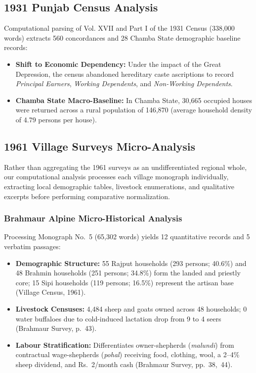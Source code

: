 \documentclass[11pt,a4paper]{article}
\begin{document}
\subsection{1931 Punjab Census Analysis}
Computational parsing of Vol. XVII and Part I of the 1931 Census (338,000 words) extracts 560 concordances and 28 Chamba State demographic baseline records:
\begin{itemize}[leftmargin=*]
    \item \textbf{Shift to Economic Dependency:} Under the impact of the Great Depression, the census abandoned hereditary caste ascriptions to record \textit{Principal Earners}, \textit{Working Dependents}, and \textit{Non-Working Dependents}.
    \item \textbf{Chamba State Macro-Baseline:} In Chamba State, 30,665 occupied houses were returned across a rural population of 146,870 (average household density of 4.79 persons per house).
\end{itemize}

\subsection{1961 Village Surveys Micro-Analysis}
Rather than aggregating the 1961 surveys as an undifferentiated regional whole, our computational analysis processes each village monograph individually, extracting local demographic tables, livestock enumerations, and qualitative excerpts before performing comparative normalization.

\subsubsection{Brahmaur Alpine Micro-Historical Analysis}
Processing Monograph No.~5 (65,302 words) yields 12 quantitative records and 5 verbatim passages:
\begin{itemize}[leftmargin=*]
    \item \textbf{Demographic Structure:} 55 Rajput households (293 persons; 40.6\%) and 48 Brahmin households (251 persons; 34.8\%) form the landed and priestly core; 15 Sipi households (119 persons; 16.5\%) represent the artisan base (Village Census, 1961).
    \item \textbf{Livestock Censuses:} 4,484 sheep and goats owned across 48 households; 0 water buffaloes due to cold-induced lactation drop from 9 to 4 seers (Brahmaur Survey, p.~43).
    \item \textbf{Labour Stratification:} Differentiates owner-shepherds (\textit{malundi}) from contractual wage-shepherds (\textit{pohal}) receiving food, clothing, wool, a 2--4\% sheep dividend, and Rs.~2/month cash (Brahmaur Survey, pp.~38,~44).
\end{itemize}
\end{document}
